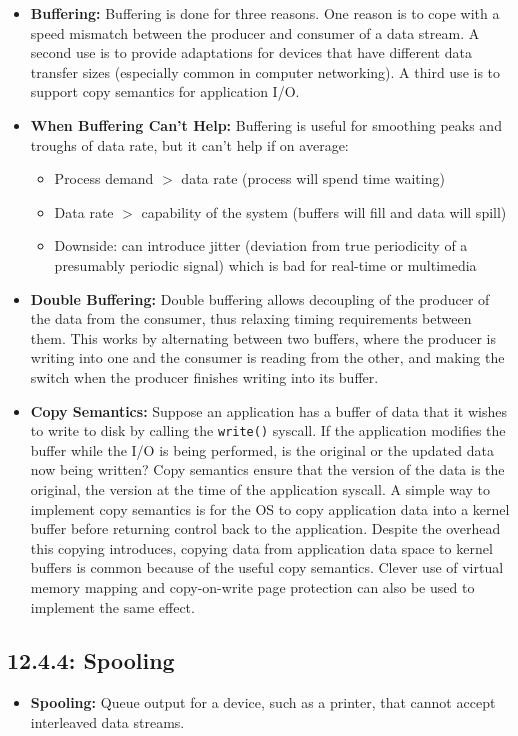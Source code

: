 \documentclass[12pt]{article}
\begin{document}
\begin{itemize}
    \item \textbf{Buffering:} Buffering is done for three reasons. One reason is to cope with a speed mismatch between the producer and consumer of a data stream. A second use is to provide adaptations for devices that have different data transfer sizes (especially common in computer networking). A third use is to support copy semantics for application I/O.
    \item \textbf{When Buffering Can't Help:} Buffering is useful for smoothing peaks and troughs of data rate, but it can't help if on average:
        \begin{itemize}
            \item Process demand \(>\) data rate (process will spend time waiting)
            \item Data rate \(>\) capability of the system (buffers will fill and data will spill)
            \item Downside: can introduce jitter (deviation from true periodicity of a presumably periodic signal) which is bad for real-time or multimedia
        \end{itemize}
    \item \textbf{Double Buffering:} Double buffering allows decoupling of the producer of the data from the consumer, thus relaxing timing requirements between them. This works by alternating between two buffers, where the producer is writing into one and the consumer is reading from the other, and making the switch when the producer finishes writing into its buffer.
    \item \textbf{Copy Semantics:} Suppose an application has a buffer of data that it wishes to write to disk by calling the \texttt{write()} syscall. If the application modifies the buffer while the I/O is being performed, is the original or the updated data now being written? Copy semantics ensure that the version of the data is the original, the version at the time of the application syscall. A simple way to implement copy semantics is for the OS to copy application data into a kernel buffer before returning control back to the application. Despite the overhead this copying introduces, copying data from application data space to kernel buffers is common because of the useful copy semantics. Clever use of virtual memory mapping and copy-on-write page protection can also be used to implement the same effect.
\end{itemize}

\subsection*{12.4.4: Spooling}

\begin{itemize}
    \item \textbf{Spooling:} Queue output for a device, such as a printer, that cannot accept interleaved data streams.
\end{itemize}


\end{document}
